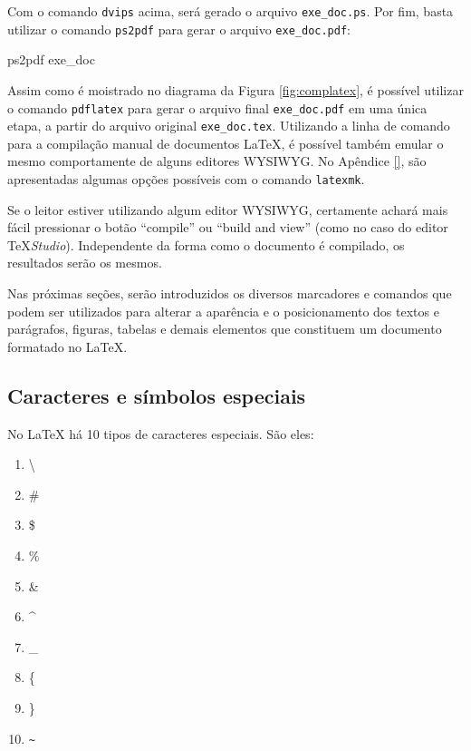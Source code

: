 Com o comando {\tt dvips} acima, será gerado o arquivo {\tt exe\_doc.ps}. Por fim, basta utilizar o comando {\tt ps2pdf} para gerar o arquivo {\tt exe\_doc.pdf}:

\begin{meucomando}
ps2pdf exe_doc
\end{meucomando}

Assim como é moistrado no diagrama da Figura \ref{fig:complatex}, é possível utilizar o comando {\tt pdflatex} para gerar o arquivo final {\tt exe\_doc.pdf} em uma única etapa, a partir do arquivo original {\tt exe\_doc.tex}. Utilizando a linha de comando para a compilação manual de documentos \LaTeX{}, é possível também emular o mesmo comportamente de alguns editores WYSIWYG. No Apêndice \ref{}, são apresentadas algumas opções possíveis com o comando {\tt latexmk}.

Se o leitor estiver utilizando algum editor WYSIWYG, certamente achará mais fácil pressionar o botão ``compile'' ou ``build and view'' (como no caso do editor \TeX \textit{Studio}). Independente da forma como o documento é compilado, os resultados serão os mesmos.

Nas próximas seções, serão introduzidos os diversos marcadores e comandos que podem ser utilizados para alterar a aparência e o posicionamento dos textos e parágrafos, figuras, tabelas e demais elementos que constituem um documento formatado no \LaTeX{}.

\subsection{Caracteres e símbolos especiais}
\label{sec:carac_especiais}

No \LaTeX{} há 10 tipos de caracteres especiais. São eles:

\begingroup
\renewcommand{\labelenumi}{\arabic{enumi})}
\begin{multicols}{5}
    \begin{enumerate}
        \item \textbackslash
        \item \#
        \item \$
        \item \%
        \item \&
        \item \^{}
        \item \_
        \item \{
        \item \}
        \item \texttt{\~{}}
    \end{enumerate}
\end{multicols}
\endgroup

